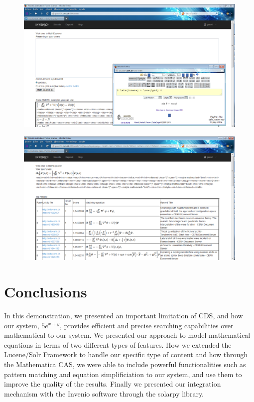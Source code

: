 \documentclass{sig-alternate}
\begin{document}
\begin{figure}
\centering
\begin{minipage}{.27\textwidth}
  \includegraphics[width=0.9\linewidth]{images/figures/input_interface.png}
  \label{fig:test1}
\end{minipage}%
\begin{minipage}{.27\textwidth}
  \includegraphics[width=0.9\linewidth]{images/figures/results_interface.png}
  \label{fig:test2}
\end{minipage}
\end{figure}

\section{Conclusions}

In this demonstration, we presented an important limitation of CDS, and how our system, $5e^{x+y}$, provides efficient and precise searching capabilities over mathematical to our system. We presented our approach to model mathematical equations in terms of two different types of features. How we extended the Lucene/Solr Framework to handle our specific type of content and how through the Mathematica CAS, we were able to include powerful functionalities such as pattern matching and equation simplificiation to our system, and use them to improve the quality of the results. Finally we presented our integration mechanism with the Invenio software through the solarpy library.
\end{document}
